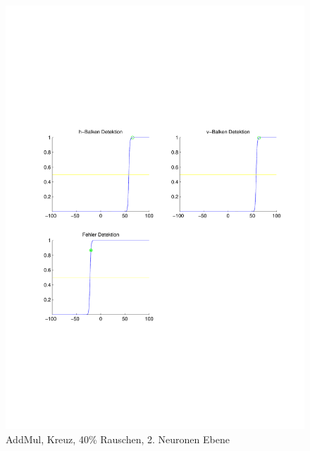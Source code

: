 \begin{figure}[hbt]
\begin{minipage}{0.8 \textwidth}
		\includegraphics[width=\textwidth]{./Bilder/Auswertung/Endergebnis/TypeAddMul_Rauschen40_Cross_Layer2}
		\caption{AddMul, Kreuz, 40\% Rauschen, 2. Neuronen Ebene}
		\label{AddMul_Kreuz_40_2}
	\end{minipage}
\end{figure}

